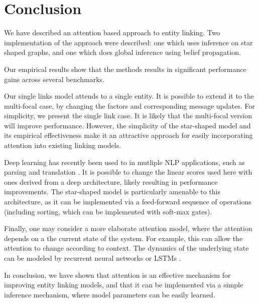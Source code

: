 \section{Conclusion}
\label{sec:End}

We have described an attention based approach to entity linking. Two implementation
of the approach were described: one which uses inference on star shaped graphs, and one
which does global inference using belief propagation.

Our empirical results show that the methods results in significant performance gains
across several benchmarks. 

Our single links model attends to a single entity. It is possible to extend it to the 
multi-focal case, by changing the factors and corresponding message updates. For simplicity, 
we present the single link case. It is likely that the multi-focal version will improve performance. However,
the simplicity of the star-shaped model and its empirical effectiveness make it an attractive
approach for easily incorporating attention into existing linking models.

Deep learning has recently been used to in mutliple NLP applications, such as parsing \cite{chen2014fast} and translation \cite{bahdanau2014neural}.
It is possible to change the linear scores used here with ones derived from a deep architecture, likely resulting
in performance improvements. The star-shaped model is particularly amenable to this architecture, as it can be implemented via
a feed-forward sequence of operations (including sorting, which can be implemented with soft-max gates).

Finally, one may consider a more elaborate attention model, where the attention depends on a the current state of the system.
For example, this can allow the attention to change according to context. The dynamics of the underlying state can be modeled by
recurrent neural networks or LSTMs \cite{bahdanau2014neural}. 

In conclusion, we have shown that attention is an effective mechanism for improving entity linking models, and that it can be implemented
via a simple inference mechanism, where model parameters can be easily learned.

